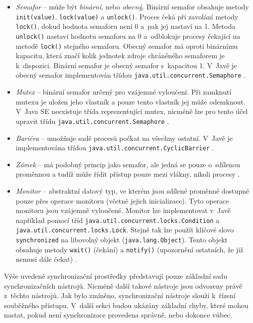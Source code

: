 \begin{itemize}
\item \textit{Semafor} -- může být \textit{binární}, nebo \textit{obecný}. Binární semafor obsahuje metody \texttt{init(value)}, \texttt{lock(value)} a \texttt{unlock()}. Proces čeká při zavolání metody \texttt{lock()}, dokud hodnota semaforu není 0 a~pak jej nastaví na 1. Metoda \texttt{unlock()} nastaví hodnotu semaforu na 0 a~odblokuje procesy čekající na metodě \texttt{lock()} stejného semaforu. Obecný semafor má oproti binárnímu kapacitu, která značí kolik jednotek zdroje chráněného semaforem je k~dispozici. Binární semafor je obecný semafor s~kapacitou 1. V~Javě je obecný semafor implementován třídou \texttt{java.util.concurrent.Semaphore} \cite{cite:OS2,cite:javad}.

\item \textit{Mutex} -- binární semafor určený pro vzájemné vyloučení. Při zamknutí mutexu je uložen jeho vlastník a pouze tento vlastník jej může odemknout. V~Java SE neexistuje třída reprezentující mutex, nicméně lze pro tento účel upravit třídu \texttt{java.util.concurrent.Semaphore}  \cite{cite:OS2,cite:javad}.

\item \textit{Bariéra} -- umožňuje sadě procesů počkat na všechny ostatní. V~Javě je implementována třídou \texttt{java.util.concurrent.CyclicBarrier} \cite{cite:javad}.

\item \textit{Zámek} -- má podobný princip jako semafor, ale jedná se pouze o~sdílenou proměnnou a tudíž může řídit přístup pouze mezi vlákny, nikoli procesy  \cite{cite:OS1}.

\item \textit{Monitor} -- abstraktní datový typ, ve kterém jsou sdílené proměnné dostupné pouze přes operace monitoru (včetně jejich inicializace). Tyto operace monitoru jsou vzájemně vyloučené. Monitor lze implementovat v~Javě například pomocí tříd \texttt{java.util.concurrent.locks.\-Condition} a \texttt{java.util.concurrent.locks.Lock}. Stejně tak lze použít klíčové slovo \texttt{synchronized} na libovolný objekt (\texttt{java.lang.Object}). Tento objekt obsahuje metody \texttt{wait()} (čekání) a \texttt{notify()} (upozornění ostatních, že již nemusí dále čekat) \cite{cite:OS2,cite:javad}.

\end{itemize}

Výše uvedené synchronizační prostředky představují pouze základní sadu synchronizačních nástrojů. Nicméně další takové nástroje jsou odvozeny právě z~těchto nástrojů. Jak bylo zmíněno, synchronizační nástroje slouží k~řízení souběžného přístupu. V~další sekci budou ukázány základní chyby, které mohou nastat, pokud není synchronizace provedena správně, nebo dokonce vůbec.

